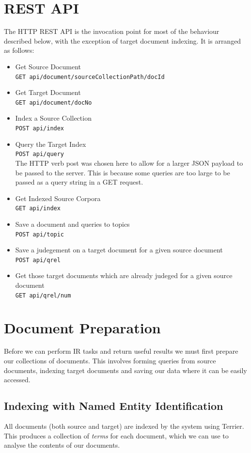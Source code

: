 \documentclass{l4proj}
\newcommand{\code}[1]{\texttt{#1}}
\begin{document}
\section{REST API}
The HTTP REST API is the invocation point for most of the behaviour described below, with the exception of target document indexing. It is arranged as follows:
\begin{itemize}
\item Get Source Document \\
\code{GET api/document/{sourceCollectionPath}/{docId}}
\item Get Target Document \\
\code{GET api/document/{docNo}}
\item Index a Source Collection \\
\code{POST api/index}
\item Query the Target Index \\
\code{POST api/query} \\
The HTTP verb post was chosen here to allow for a larger JSON payload to be passed to the server. This is because some queries are too large to be passed as a query string in a GET request.
\item Get Indexed Source Corpora \\
\code{GET api/index}
\item Save a document and queries to topics \\
\code{POST api/topic}
\item Save a judegement on a target document for a given source document \\
\code{POST api/qrel}
\item Get those target documents which are already judeged for a given source document \\
\code{GET api/qrel/{num}}
\end{itemize}

\section{Document Preparation}
Before we can perform IR tasks and return useful results we must first prepare our collections of documents. This involves forming queries from source documents, indexing target documents and saving our data where it can be easily accessed.

\subsection{Indexing with Named Entity Identification} \label{nertok}
All documents (both source and target) are indexed by the system using Terrier. This produces a collection of \textit{terms} for each document, which we can use to analyse the contents of our documents.
\end{document}

